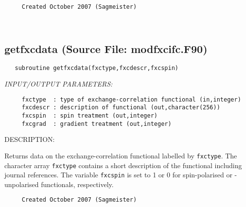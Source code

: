 \documentclass[11pt]{article}
\begin{document}
\begin{verbatim}     Created October 2007 (Sagmeister)\end{verbatim}
 
 
\mbox{}\hrulefill\ 
 
\subsection{getfxcdata (Source File: modfxcifc.F90)}


\begin{verbatim}   subroutine getfxcdata(fxctype,fxcdescr,fxcspin)\end{verbatim}{\em INPUT/OUTPUT PARAMETERS:}
\begin{verbatim}     fxctype  : type of exchange-correlation functional (in,integer)
     fxcdescr : description of functional (out,character(256))
     fxcspin  : spin treatment (out,integer)
     fxcgrad  : gradient treatment (out,integer)\end{verbatim}
{\sf DESCRIPTION:\\ }


     Returns data on the exchange-correlation functional labelled by
     {\tt fxctype}. The character array {\tt fxctype} contains a short
     description
     of the functional including journal references. The variable 
     {\tt fxcspin} is
     set to 1 or 0 for spin-polarised or -unpolarised functionals,
     respectively.
  
\begin{verbatim}     Created October 2007 (Sagmeister)\end{verbatim}











\end{document}
